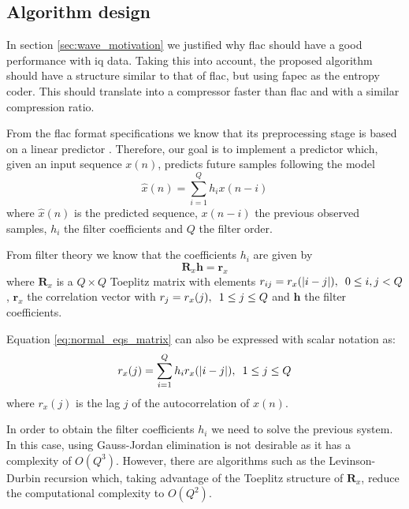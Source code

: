 \subsection{Algorithm design}
In section \ref{sec:wave_motivation} we justified why \acrshort{flac} should have a good performance with \acrshort{iq} data. Taking this into account, the proposed algorithm should have a structure similar to that of \acrshort{flac}, but using \acrshort{fapec} as the entropy coder. This should translate into a compressor faster than \acrshort{flac} and with a similar compression ratio.

From the \acrshort{flac} format specifications we know that its preprocessing stage is based on a linear predictor \parencite{FLAC}. Therefore, our goal is to implement a predictor which, given an input sequence $x(n)$, predicts future samples following the model
\begin{equation} \label{eq:prediction_x}
\hat{x}(n) = \sum_{i=1}^{Q} h_i x(n-i)
\end{equation}
where $\hat{x}(n)$ is the predicted sequence, $x(n-i)$ the previous observed samples, $h_i$ the filter coefficients and $Q$ the filter order.

From filter theory \parencite{Haykin} \parencite{PSAVC} we know that the coefficients $h_i$ are given by
\begin{equation} \label{eq:normal_eqs_matrix}
\mathbf{R}_x \mathbf{h} = \mathbf{r}_x
\end{equation}
where $\mathbf{R}_x$ is a $Q \times Q$ Toeplitz matrix with elements $r_{ij} = r_x(|i-j|),\hspace{0.5em} 0 \leq i,j < Q$, $\mathbf{r}_x$ the correlation vector with $r_j = r_x(j),\hspace{0.5em} 1 \leq j \leq Q$ and $\mathbf{h}$ the filter coefficients.

Equation \ref{eq:normal_eqs_matrix} can also be expressed with scalar notation as:
\begin{equation} \label{eq:normal_equations}
r_x(j) = \sum_{i=1}^{Q} h_i r_x(|i-j|) ,\hspace{0.5em} 1 \leq j \leq Q
\end{equation}
where $r_x(j)$ is the lag $j$ of the autocorrelation of $x(n)$.

In order to obtain the filter coefficients $h_i$ we need to solve the previous system. In this case, using Gauss-Jordan elimination is not desirable as it has a complexity of $O(Q^3)$. However, there are algorithms such as the Levinson-Durbin recursion \parencite{LevinsonDurbin} which, taking advantage of the Toeplitz structure of $\mathbf{R}_x$, reduce the computational complexity to $O(Q^2)$.

